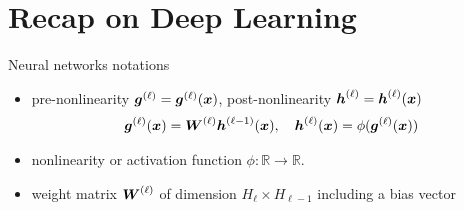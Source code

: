 \documentclass[9pt,handout]{beamer}
\begin{document}




\section{Recap on Deep Learning}

\begin{frame}{Neural networks notations}

\begin{figure}[ht!]
\begin{center}
\scalebox{.8}{

}
\end{center}
\label{figure:nn_visualization_intro}
\end{figure}

\begin{itemize}
	\item \alert{pre-nonlinearity} $\boldsymbol{g}^{(\ell)}=\boldsymbol{g}^{(\ell)}(\boldsymbol{x})$, \alert{post-nonlinearity}  $\boldsymbol{h}^{(\ell)}=\boldsymbol{h}^{(\ell)}(\boldsymbol{x})$
\begin{align*}\label{eq:propagation}
      \boldsymbol{g}^{(\ell)}(\boldsymbol{x}) = \boldsymbol{W}^{(\ell)} \boldsymbol{h}^{(\ell - 1)} (\boldsymbol{x}), \quad \boldsymbol{h}^{(\ell)} (\boldsymbol{x}) = \phi(\boldsymbol{g}^{(\ell)}(\boldsymbol{x}))
\end{align*}
	\item \alert{nonlinearity} or \alert{activation function}  $\phi: \mathbb{R} \to \mathbb{R}$.
	\item \alert{weight matrix} $\boldsymbol{W}^{(\ell)}$ of dimension $H_\ell\times H_{\ell-1}$ including a bias vector
\end{itemize}

\end{frame}
\end{document}
